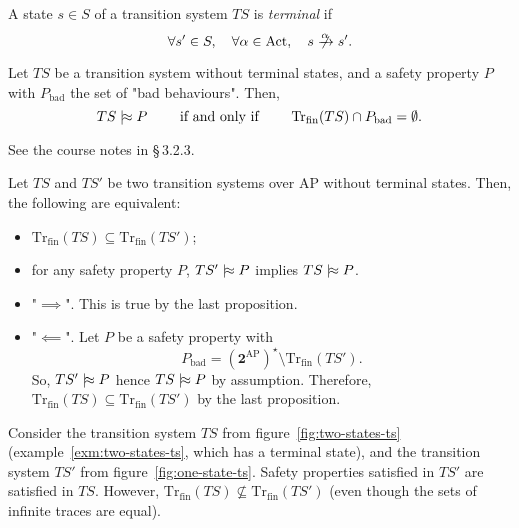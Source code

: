 \documentclass[./main]{subfiles}
\begin{document}
  \begin{en-defn}
    A state $s \in S$ of a transition system $TS$  is \textit{terminal} if
    \[
      \forall s' \in S, \quad \forall \alpha \in \mathrm{Act}, \quad s \centernot{\tr\alpha} s'
    .\]
  \end{en-defn}

  \begin{en-prop}
    Let $TS$ be a transition system without terminal states, and a safety property $P$ with $P_\mathrm{bad}$ the set of "bad behaviours".
    Then, 
    \[
    TS \mathrel{{|}\!{\approx}} P \quad\quad \text{ if and only if } \quad\quad \mathrm{Tr}_\mathrm{fin}(TS) \cap P_\mathrm{bad} = \emptyset
    .\] 
  \end{en-prop}
  \begin{en-prv}
    See the course notes in §\,3.2.3.
  \end{en-prv}

  \begin{en-lem}
    Let $TS$ and $TS'$ be two transition systems over $\mathrm{AP}$ without terminal states.
    Then, the following are equivalent:
    \begin{itemize}
      \item $\mathrm{Tr}_\mathrm{fin}(TS) \subseteq \mathrm{Tr}_\mathrm{fin}(TS')$;
      \item for any safety property $P$, $TS' \mathrel{{|}\!{\approx}} P$ implies $TS \mathrel{{|}\!{\approx}} P$.
    \end{itemize}
  \end{en-lem}
  \begin{en-prv}
    \begin{itemize}
      \item "$\implies$". This is true by the last proposition.
      \item "$\impliedby$". 
        Let $P$ be a safety property with \[
        P_\mathrm{bad} = (\mathbf{2}^\mathrm{AP})^\star \setminus \mathrm{Tr}_\mathrm{fin}(TS')
        .\]
        So, $TS' \mathrel{{|}\!{\approx}} P$ hence  $TS \mathrel{{|}\!{\approx}} P$ by assumption.
        Therefore,  $\mathrm{Tr}_\mathrm{fin}(TS) \subseteq \mathrm{Tr}_\mathrm{fin}(TS')$ by the last proposition.
    \end{itemize}
  \end{en-prv}

  \begin{en-exm}
    Consider the transition system $TS$ from figure~\ref{fig:two-states-ts} (example~\ref{exm:two-states-ts}, which has a terminal state), and the transition system $TS'$ from figure~\ref{fig:one-state-ts}.
    Safety properties satisfied in $TS'$ are satisfied in $TS$. However, $\mathrm{Tr}_\mathrm{fin}(TS) \not\subseteq \mathrm{Tr}_\mathrm{fin}(TS')$ (even though the sets of infinite traces are equal).
  \end{en-exm}
\end{document}
